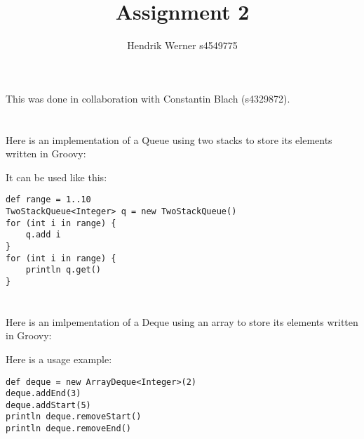 \documentclass[12pt]{article}
\title {Assignment 2}
\author {Hendrik Werner s4549775}
\begin{document}
\maketitle

This was done in collaboration with Constantin Blach (s4329872).

\section{} %
Here is an implementation of a Queue using two stacks to store its elements written in Groovy:



It can be used like this:

\begin{lstlisting}
def range = 1..10
TwoStackQueue<Integer> q = new TwoStackQueue()
for (int i in range) {
    q.add i
}
for (int i in range) {
    println q.get()
}
\end{lstlisting}

\section{} %
Here is an imlpementation of a Deque using an array to store its elements written in Groovy:



Here is a usage example:

\begin{lstlisting}
def deque = new ArrayDeque<Integer>(2)
deque.addEnd(3)
deque.addStart(5)
println deque.removeStart()
println deque.removeEnd()
\end{lstlisting}

\section{} %
\section{} %
\section{} %
\section{} %
\end{document}
